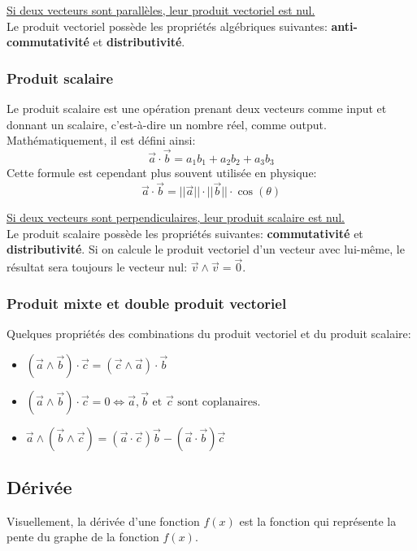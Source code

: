 \documentclass{article}
\numberwithin{equation}{section}
\begin{document}
\underline{Si deux vecteurs sont parallèles, leur produit vectoriel est nul.} \\

Le produit vectoriel possède les propriétés algébriques suivantes: \textbf{anti-commutativité} et \textbf{distributivité}.

\subsubsection{Produit scalaire}
Le produit scalaire est une opération prenant deux vecteurs comme input et donnant un scalaire, c'est-à-dire un nombre réel, comme output. \\
Mathématiquement, il est défini ainsi:
\begin{equation}
	\vec a \cdot \vec b = a_1b_1 + a_2b_2 + a_3b_3
\end{equation}
Cette formule est cependant plus souvent utilisée en physique:
\begin{equation}
	\boxed{ \vec a \cdot \vec b = ||\vec a|| \cdot ||\vec b|| \cdot \cos(\theta) }
\end{equation}

\underline{Si deux vecteurs sont perpendiculaires, leur produit scalaire est nul.} \\

Le produit scalaire possède les propriétés suivantes: \textbf{commutativité} et \textbf{distributivité}. Si on calcule le produit vectoriel d'un vecteur avec lui-même, le résultat sera toujours le vecteur nul: \(\vec v \wedge \vec v = \vec 0\).

\subsubsection{Produit mixte et double produit vectoriel}
Quelques propriétés des combinations du produit vectoriel et du produit scalaire:
\begin{itemize}
	\item \((\vec a \wedge \vec b) \cdot \vec c = (\vec c \wedge \vec a) \cdot \vec b\)
	\item \((\vec a \wedge \vec b) \cdot \vec c = 0 \Leftrightarrow \vec a, \vec b \text{ et } \vec c \text{ sont coplanaires.}\)
	\item \(\vec a \wedge (\vec b \wedge \vec c) = (\vec a \cdot \vec c) \vec b - (\vec a \cdot \vec b) \vec c\)
\end{itemize}

\subsection{Dérivée}
Visuellement, la dérivée d'une fonction \(f(x)\) est la fonction qui représente la pente du graphe de la fonction \(f(x)\). \\
\end{document}
